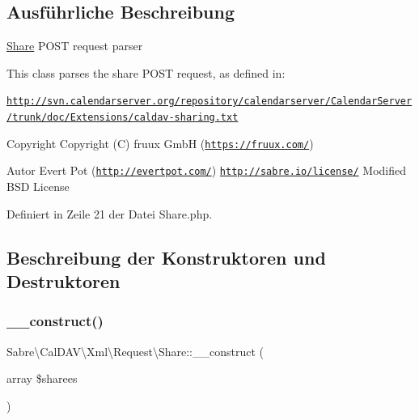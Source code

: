 \subsection{Ausführliche Beschreibung}
\mbox{\hyperlink{class_sabre_1_1_cal_d_a_v_1_1_xml_1_1_request_1_1_share}{Share}} P\+O\+ST request parser

This class parses the share P\+O\+ST request, as defined in\+:

\href{http://svn.calendarserver.org/repository/calendarserver/CalendarServer/trunk/doc/Extensions/caldav-sharing.txt}{\tt http\+://svn.\+calendarserver.\+org/repository/calendarserver/\+Calendar\+Server/trunk/doc/\+Extensions/caldav-\/sharing.\+txt}

\begin{DoxyCopyright}{Copyright}
Copyright (C) fruux GmbH (\href{https://fruux.com/}{\tt https\+://fruux.\+com/}) 
\end{DoxyCopyright}
\begin{DoxyAuthor}{Autor}
Evert Pot (\href{http://evertpot.com/}{\tt http\+://evertpot.\+com/})  \href{http://sabre.io/license/}{\tt http\+://sabre.\+io/license/} Modified B\+SD License 
\end{DoxyAuthor}


Definiert in Zeile 21 der Datei Share.\+php.



\subsection{Beschreibung der Konstruktoren und Destruktoren}
\mbox{\label{class_sabre_1_1_cal_d_a_v_1_1_xml_1_1_request_1_1_share_af2d62c51390da2206d2506349ffdad64}} 
\subsubsection{\texorpdfstring{\+\_\+\+\_\+construct()}{\_\_construct()}}
{\footnotesize\ttfamily Sabre\textbackslash{}\+Cal\+D\+A\+V\textbackslash{}\+Xml\textbackslash{}\+Request\textbackslash{}\+Share\+::\+\_\+\+\_\+construct (\begin{DoxyParamCaption}\item[{array}]{\$sharees }\end{DoxyParamCaption})}


